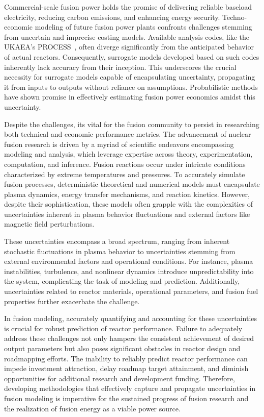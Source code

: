 \documentclass[journal]{IEEEtran}
\begin{document}
Commercial-scale fusion power holds the promise of delivering reliable baseload electricity, reducing carbon emissions, and enhancing energy security. Techno-economic modeling of future fusion power plants confronts challenges stemming from uncertain and imprecise costing models. Available analysis codes, like the UKAEA's PROCESS~\cite{Kovari2014,Kovari2016}, often diverge significantly from the anticipated behavior of actual reactors. Consequently, surrogate models developed based on such codes inherently lack accuracy from their inception. This underscores the crucial necessity for surrogate models capable of encapsulating uncertainty, propagating it from inputs to outputs without reliance on assumptions. Probabilistic methods have shown promise in effectively estimating fusion power economics amidst this uncertainty.

Despite the challenges, its vital for the fusion community to persist in researching both technical and economic performance metrics. The advancement of nuclear fusion research is driven by a myriad of scientific endeavors encompassing modeling and analysis, which leverage expertise across theory, experimentation, computation, and inference. Fusion reactions occur under intricate conditions characterized by extreme temperatures and pressures. To accurately simulate fusion processes, deterministic theoretical and numerical models must encapsulate plasma dynamics, energy transfer mechanisms, and reaction kinetics. However, despite their sophistication, these models often grapple with the complexities of uncertainties inherent in plasma behavior fluctuations and external factors like magnetic field perturbations. 

These uncertainties encompass a broad spectrum, ranging from inherent stochastic fluctuations in plasma behavior to uncertainties stemming from external environmental factors and operational conditions. For instance, plasma instabilities, turbulence, and nonlinear dynamics introduce unpredictability into the system, complicating the task of modeling and prediction. Additionally, uncertainties related to reactor materials, operational parameters, and fusion fuel properties further exacerbate the challenge.

In fusion modeling, accurately quantifying and accounting for these uncertainties is crucial for robust prediction of reactor performance. Failure to adequately address these challenges not only hampers the consistent achievement of desired output parameters but also poses significant obstacles in reactor design and roadmapping efforts. The inability to reliably predict reactor performance can impede investment attraction, delay roadmap target attainment, and diminish opportunities for additional research and development funding. Therefore, developing methodologies that effectively capture and propagate uncertainties in fusion modeling is imperative for the sustained progress of fusion research and the realization of fusion energy as a viable power source.
\end{document}
